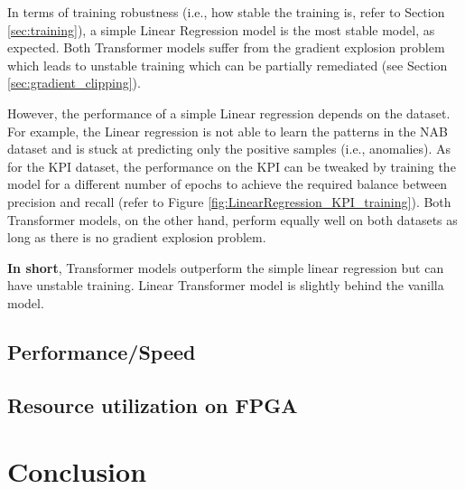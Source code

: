 \documentclass[a4paper, twoside]{report}
\theoremstyle{definition}
\numberwithin{equation}{section}
\begin{document}
In terms of training robustness (i.e., how stable the training is, refer to Section \ref{sec:training}),
a simple Linear Regression model is the most stable model, as expected. Both Transformer models suffer
from the gradient explosion problem which leads to unstable training
which can be partially remediated (see Section \ref{sec:gradient_clipping}).

However, the performance of a simple Linear regression depends on the dataset. For example,
the Linear regression is not able to learn the patterns in the NAB dataset
and is stuck at predicting only the positive samples (i.e., anomalies).
As for the KPI dataset, the performance on the KPI can be tweaked by training
the model for a different number of epochs to achieve the required balance between
precision and recall (refer to Figure \ref{fig:LinearRegression_KPI_training}).
Both Transformer models, on the other hand, perform equally well on both datasets
as long as there is no gradient explosion problem.

\textbf{In short}, Transformer models outperform the simple linear regression
but can have unstable training. Linear Transformer model is slightly behind
the vanilla model.


\section{Performance/Speed} \label{sec:performance}





\section{Resource utilization on FPGA}



\newpage
\chapter*{Conclusion}
\end{document}
